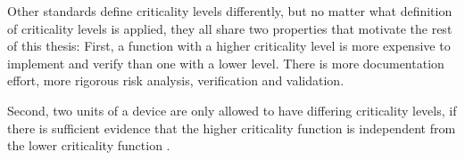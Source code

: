 Other standards define criticality levels differently, but no matter what definition of criticality levels is applied, they all share two properties that motivate the rest of this thesis: First, a function with a higher criticality level is more expensive to implement and verify than one with a lower level. There is more documentation effort, more rigorous risk analysis, verification and validation. 

Second, two units of a device are only allowed to have differing criticality levels, if there is sufficient evidence that the higher criticality function is independent from the lower criticality function \cite{IEC.2010-1}\cite{IEC.2010-2}.  %

